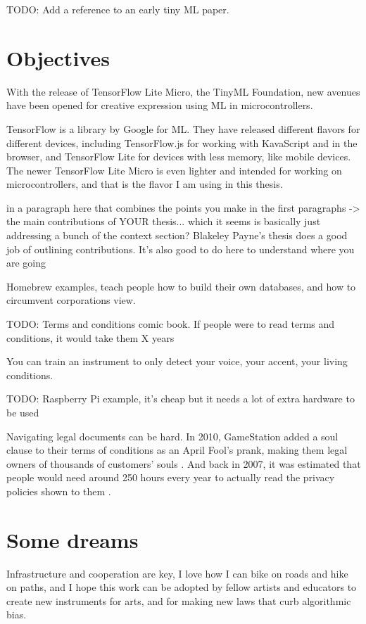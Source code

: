 TODO: Add a reference to an early tiny ML paper.

\section{Objectives}

With the release of TensorFlow Lite Micro, the TinyML Foundation, new avenues have been opened for creative expression using \acrshort{ML} in microcontrollers.

TensorFlow is a library by Google for \acrshort{ML}. They have released different flavors for different devices, including TensorFlow.js for working with KavaScript and in the browser, and TensorFlow Lite for devices with less memory, like mobile devices. The newer TensorFlow Lite Micro is even lighter and intended for working on microcontrollers, and that is the flavor I am using in this thesis.

in a paragraph here that combines the points you make in the first paragraphs -> the main contributions of YOUR thesis... which it seems is basically just addressing a bunch of the context section? Blakeley Payne's thesis does a good job of outlining contributions. It's also good to do here to understand where you are going

Homebrew examples, teach people how to build their own databases, and how to circumvent corporations view.

TODO: Terms and conditions comic book. If people were to read terms and conditions, it would take them X years

You can train an instrument to only detect your voice, your accent, your living conditions.

TODO: Raspberry Pi example, it’s cheap but it needs a lot of extra hardware to be used

Navigating legal documents can be hard. In 2010, GameStation added a soul clause to their terms of conditions as an April Fool's prank, making them legal owners of thousands of customers' souls \cite{website-huffpost-gamestation-soul-clause}. And back in 2007, it was estimated that people would need around 250 hours every year to actually read the privacy policies shown to them \cite{article-cost-of-reading-privacy-policies}.

\section{Some dreams}

Infrastructure and cooperation are key, I love how I can bike on roads and hike on paths, and I hope this work can be adopted by fellow artists and educators to create new instruments for arts, and for making new laws that curb algorithmic bias.

